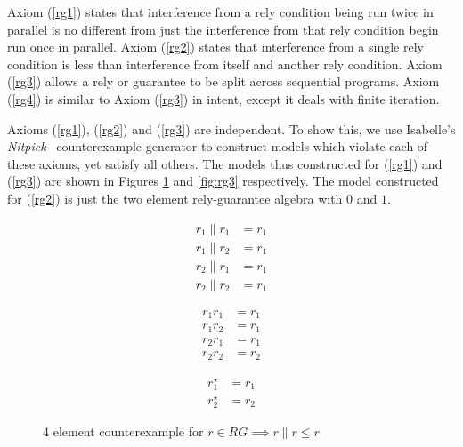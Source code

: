 \documentclass{llncs}
\begin{document}

Axiom (\ref{rg1}) states that interference from a rely condition being
run twice in parallel is no different from just the interference from
that rely condition begin run once in parallel. Axiom (\ref{rg2})
states that interference from a single rely condition is less than
interference from itself and another rely condition. Axiom (\ref{rg3})
allows a rely or guarantee to be split across sequential
programs. Axiom (\ref{rg4}) is similar to Axiom (\ref{rg3}) in intent,
except it deals with finite iteration.

Axioms (\ref{rg1}), (\ref{rg2}) and (\ref{rg3}) are independent. To
show this, we use Isabelle's
\emph{Nitpick}~\cite{blanchette_nitpick:_2010} counterexample generator
to construct models which violate each of these axioms, yet satisfy
all others. The models thus constructed for (\ref{rg1}) and
(\ref{rg3}) are shown in Figures \ref{fig:rg1} and \ref{fig:rg3}
respectively. The model constructed for (\ref{rg2}) is just the two
element rely-guarantee algebra with $0$ and $1$.

\begin{figure}[H]
\centering
\begin{minipage}{0.24\textwidth}
\end{minipage}
\begin{minipage}{0.24\textwidth}
\begin{align*}
r_1 \| r_1 &= r_1\\
r_1 \| r_2 &= r_1\\
r_2 \| r_1 &= r_1\\
r_2 \| r_2 &= r_1
\end{align*}
\end{minipage}
\begin{minipage}{0.24\textwidth}
\begin{align*}
r_1r_1 &= r_1\\
r_1r_2 &= r_1\\
r_2r_1 &= r_1\\
r_2r_2 &= r_2
\end{align*}
\end{minipage}
\begin{minipage}{0.24\textwidth}
\begin{align*}
r_1^\star &= r_1\\
r_2^\star &= r_2
\end{align*}
\end{minipage}
\caption{4 element counterexample for $r \in RG \implies r\|r \le r$}
\label{fig:rg1}
\end{figure}
\end{document}
